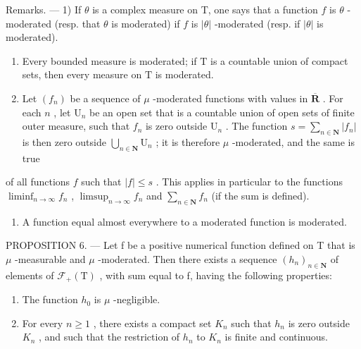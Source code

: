 Remarks. --- 1) If \(\theta\) is a complex measure on T, one says that a function \(f\) is \(\theta\) -moderated (resp. that \(\theta\) is moderated) if \(f\) is \(|\theta|\) -moderated (resp. if \(|\theta|\) is moderated).

\begin{enumerate}
\def\labelenumi{\arabic{enumi})}
\setcounter{enumi}{1}
\item
  Every bounded measure is moderated; if \(\mathrm{T}\) is a countable union of compact sets, then every measure on \(\mathrm{T}\) is moderated.
\item
  Let \((f_n)\) be a sequence of \(\mu\) -moderated functions with values in \(\overline{\mathbf{R}}\) . For each \(n\) , let \(\mathrm{U}_n\) be an open set that is a countable union of open sets of finite outer measure, such that \(f_n\) is zero outside \(\mathrm{U}_n\) . The function \(s = \sum_{n \in \mathbf{N}} |f_n|\) is then zero outside \(\bigcup_{n\in \mathbf{N}}\mathrm{U}_n\) ; it is therefore \(\mu\) -moderated, and the same is true
\end{enumerate}

of all functions \(f\) such that \(|f| \leqslant s\) . This applies in particular to the functions \(\liminf_{n \to \infty} f_n\) , \(\limsup_{n \to \infty} f_n\) and \(\sum_{n \in \mathbf{N}} f_n\) (if the sum is defined).

\begin{enumerate}
\def\labelenumi{\arabic{enumi})}
\setcounter{enumi}{3}
\tightlist
\item
  A function equal almost everywhere to a moderated function is moderated.
\end{enumerate}

PROPOSITION 6. --- Let f be a positive numerical function defined on T that is \(\mu\) -measurable and \(\mu\) -moderated. Then there exists a sequence \((h_{n})_{n\in\mathbf{N}}\) of elements of \(\mathcal{F}_{+}(\mathrm{T})\) , with sum equal to f, having the following properties:

\begin{enumerate}
\def\labelenumi{\arabic{enumi})}
\item
  The function \(h_0\) is \(\mu\) -negligible.
\item
  For every \(n \geqslant 1\) , there exists a compact set \(K_{n}\) such that \(h_{n}\) is zero outside \(K_{n}\) , and such that the restriction of \(h_{n}\) to \(K_{n}\) is finite and continuous.
\end{enumerate}

